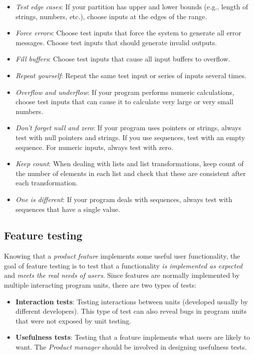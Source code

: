 \begin{itemize}
	\item \textit{Test edge cases}: If your partition has upper and lower bounds (e.g., length of strings, numbers, etc.), choose inputs at the edges of the range.
	\item \textit{Force errors}: Choose test inputs that force the system to generate all error messages. Choose test inputs that should generate invalid outputs.
	\item \textit{Fill buffers}: Choose test inputs that cause all input buffers to overflow.
	\item \textit{Repeat yourself}: Repeat the same test input or series of inputs several times.
	\item \textit{Overflow and underflow}: If your program performs numeric calculations, choose test inputs that can cause it to calculate very large or very small numbers.
	\item \textit{Don't forget null and zero}: If your program uses pointers or strings, always test with null pointers and strings. If you use sequences, test with an empty sequence. For numeric inputs, always test with zero.
	\item \textit{Keep count}: When dealing with lists and list transformations, keep count of the number of elements in each list and check that these are consistent after each transformation.
	\item \textit{One is different}: If your program deals with sequences, always test with sequences that have a single value.
\end{itemize}

\subsection{Feature testing}

Knowing that a \textit{product feature} implements some useful user functionality, the goal of feature testing is to test that a functionality \textit{is implemented as expected} and \textit{meets the real needs of users}. Since features are normally implemented by multiple interacting program units, there are two types of tests:

\begin{itemize}
 \item \textbf{Interaction tests}: Testing interactions between units (developed usually by different developers). This type of test can also reveal bugs in program units that were not exposed by unit testing.
 \item \textbf{Usefulness tests}: Testing that a feature implements what users are likely to want. The \textit{Product manager} should be involved in designing usefulness tests.
\end{itemize}

